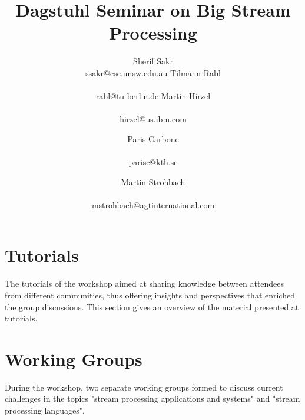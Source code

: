 \documentclass[preprint]{sig-alternate-10pt}
\begin{document}
\title{Dagstuhl Seminar on Big Stream Processing}

\newcommand*{\emailn}[1]{\textsf{\normalsize #1}}

\author{
\alignauthor
Sherif Sakr\\
  \emailn{ssakr@cse.unsw.edu.au}
\alignauthor
Tilmann Rabl\\
  \\
  \emailn{rabl@tu-berlin.de}
\alignauthor
Martin Hirzel\\
  \\
  \emailn{hirzel@us.ibm.com}
\and
\alignauthor
Paris Carbone\\
  \\
  \emailn{parisc@kth.se}
\and
\alignauthor
Martin Strohbach\\
  \\
  \emailn{mstrohbach@agtinternational.com}}


\maketitle



\section{Tutorials}
The tutorials of the workshop aimed at sharing knowledge between
attendees from different communities, thus offering insights and
perspectives that enriched the group discussions. This section gives
an overview of the material presented at tutorials.




\section{Working Groups}
During the workshop, two separate working groups formed to discuss
current challenges in the topics "stream processing applications and systems"
and "stream processing languages". 






\balance

\end{document}
